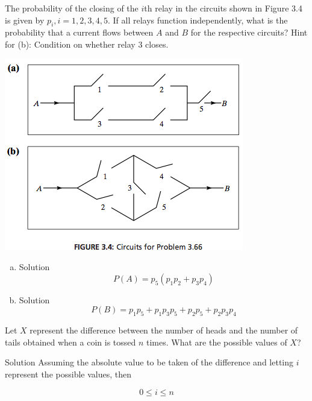 \documentclass{article}
\begin{document}
\begin{spacing}{1.1}
\maketitle

\newpage
\begin{homeworkProblem}
The probability of the closing of the $i$th relay in the circuits 
shown in Figure 3.4 is given by $p_i, i = 1, 2, 3, 4, 5$. If all 
relays function independently, what is the probability that a 
current flows between $A$ and $B$ for the respective circuits?
Hint for (b): Condition on whether relay 3 closes.

\includegraphics{p108_66}
  \begin{enumerate}[(a)]
    \item
      \begin{homeworkSection}{Solution}
        \[P(A) = p_5 (p_1 p_2 + p_3 p_4)\]
      \end{homeworkSection}
    \item
      \begin{homeworkSection}{Solution}
        \[P(B) = p_1 p_5 + p_1 p_3 p_5 + p_2 p_5 + p_2 p_3 p_4\]
      \end{homeworkSection}
  \end{enumerate}
\end{homeworkProblem}
\newpage
\begin{homeworkProblem}
  Let $X$ represent the difference between the number of heads
  and the number of tails obtained when a coin is tossed $n$ times. 
  What are the possible values of $X$?
  \begin{homeworkSection}{Solution}
    Assuming the absolute value to be taken of the difference and
    letting $i$ represent the possible values, then 

    \[0 \le i \le n\]

  \end{homeworkSection}
\end{homeworkProblem}

\end{spacing}
\end{document}
